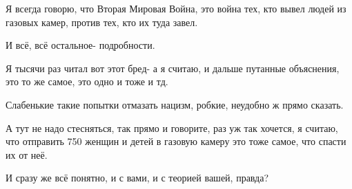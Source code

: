 Я всегда говорю, что Вторая Мировая Война, это война тех, кто вывел людей из
газовых камер, против тех, кто их туда завел.

И всё, всё остальное- подробности.

Я тысячи раз читал вот этот бред- а я считаю, и дальше путанные объяснения, это
то же самое, это одно и тоже и тд.

Слабенькие такие попытки отмазать нацизм, робкие, неудобно ж прямо сказать.

А тут не надо стесняться, так прямо и говорите, раз уж так хочется, я считаю,
что отправить 750 женщин и детей в газовую камеру это тоже самое, что спасти их
от неё.

И сразу же всё понятно, и с вами, и с теорией вашей, правда?
